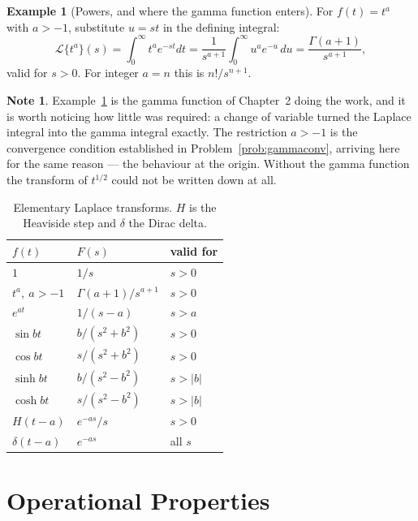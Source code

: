 \documentclass[12pt,a4paper]{report}
\theoremstyle{definition}
\newtheorem{exa}[thm]{Example}
\newtheorem{note}[thm]{Note}
\theoremstyle{plain}
\begin{document}
\begin{exa}[Powers, and where the gamma function enters]
\label{exa:laplacepower}
For $f(t) = t^{a}$ with $a>-1$, substitute $u = st$ in the defining integral:
$$\mathcal{L}\{t^{a}\}(s)
= \int^{\infty}_{0}t^{a}e^{-st}dt
= \frac{1}{s^{a+1}}\int^{\infty}_{0}u^{a}e^{-u}\,du
= \frac{\Gamma(a+1)}{s^{a+1}},$$
valid for $s>0$. For integer $a=n$ this is $n!/s^{n+1}$.
\end{exa}

\begin{note}
Example~\ref{exa:laplacepower} is the gamma function of Chapter~2 doing the
work, and it is worth noticing how little was required: a change of variable
turned the Laplace integral into the gamma integral exactly. The restriction
$a>-1$ is the convergence condition established in Problem~\ref{prob:gammaconv}, arriving here
for the same reason --- the behaviour at the origin. Without the gamma function
the transform of $t^{1/2}$ could not be written down at all.
\end{note}

\begin{table}[H]
\centering
\small
\begin{tabular}{|l|l|l|}
\hline
$f(t)$ & $F(s)$ & valid for \\
\hline
$1$ & $1/s$ & $s>0$\\
$t^{a},\ a>-1$ & $\Gamma(a+1)/s^{a+1}$ & $s>0$\\
$e^{at}$ & $1/(s-a)$ & $s>a$\\
$\sin bt$ & $b/\left(s^{2}+b^{2}\right)$ & $s>0$\\
$\cos bt$ & $s/\left(s^{2}+b^{2}\right)$ & $s>0$\\
$\sinh bt$ & $b/\left(s^{2}-b^{2}\right)$ & $s>|b|$\\
$\cosh bt$ & $s/\left(s^{2}-b^{2}\right)$ & $s>|b|$\\
$H(t-a)$ & $e^{-as}/s$ & $s>0$\\
$\delta(t-a)$ & $e^{-as}$ & all $s$\\
\hline
\end{tabular}
\caption{Elementary Laplace transforms. $H$ is the Heaviside step and $\delta$
the Dirac delta.}
\label{tab:laplace}
\end{table}

\section{Operational Properties}
\end{document}
